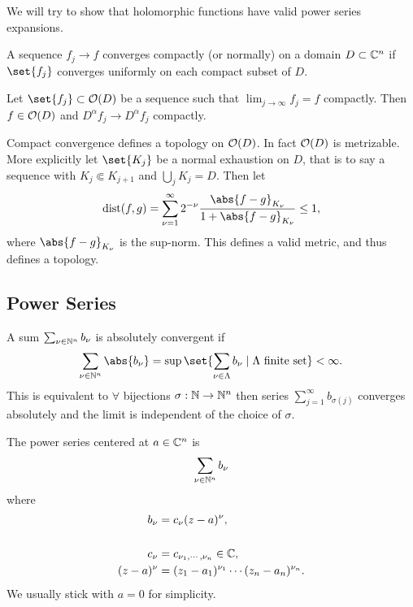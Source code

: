 We will try to show that holomorphic functions have valid power series expansions.

\begin{definition}
    A sequence $f_j \to f$ converges compactly (or normally) on a domain $D \subset \mathbb{C}^n$ if $\set{ f_j }$ converges uniformly on each compact subset of $D$.
\end{definition}

\begin{theorem}
    Let $\set{f_j} \subset \O(D)$ be a sequence such that $\lim_{j \to \infty} f_j = f$ compactly. Then $f \in \mathcal{O}(D)$ and $D^\alpha f_j \to D^\alpha f_j$ compactly.
\end{theorem}

\begin{remark}
    Compact convergence defines a topology on $\mathcal{O}(D)$. In fact $\mathcal{O}(D)$ is metrizable. More explicitly let $\set{K_j}$ be a normal exhaustion on $D$, that is to say a sequence with $K_j \Subset K_{j+1}$ and $\bigcup_j K_j = D$. Then let
    \begin{align*}
        \operatorname{dist}(f,g) = \sum_{\nu = 1}^\infty 2^{- \nu} \frac{\abs{f-g}_{K_\nu}}{1 + \abs{f-g}_{K_\nu} } \leq 1,
    \end{align*}
    where $\abs{f-g}_{K_\nu}$ is the sup-norm. This defines a valid metric, and thus defines a topology.
\end{remark}

\subsection{Power Series}

\begin{definition}
    A sum $\sum_{\nu \in \mathbb{N}^n} b_\nu$ is absolutely convergent if 
    \begin{align*}
        \sum_{\nu \in \N^n} \abs{b_\nu} = \sup \set{ \sum_{\nu \in \Lambda} b_\nu \mid \Lambda \text{ finite set}} < \infty.
    \end{align*}
    This is equivalent to $\forall$ bijections $ \sigma : \mathbb{N} \to \mathbb{N}^n$ then series $\sum_{j=1}^\infty b_{\sigma(j)}$ converges absolutely and the limit is independent of the choice of $\sigma$.
\end{definition}

\begin{definition}
    The power series centered at $a \in \mathbb{C}^n$ is
    \begin{align*}
        \sum_{\nu \in \mathbb{N}^n} b_\nu
    \end{align*}
    where
    \begin{align*}
        b_\nu &= c_\nu (z-a)^\nu,\\\\
        c_\nu &= c_{\nu_1, \cdots, \nu_n} \in \mathbb{C},\\
        (z-a)^\nu &= (z_1-a_1)^{\nu_1} \cdots (z_n-a_n)^{\nu_n}.
    \end{align*}
    We usually stick with $a = 0$ for simplicity.
\end{definition}

